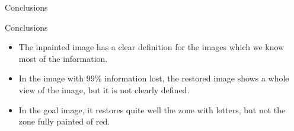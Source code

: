 \documentclass[11pt]{beamer}
\begin{document}
\begin{frame}{Conclusions}
\begin{block}{Conclusions}
\begin{itemize}
\item The inpainted image has a clear definition for the images which we know most of the information.
\item In the image with 99\% information lost, the restored image shows a whole view of the image, but it is not clearly defined.
\item In the goal image, it restores quite well the zone with letters, but not the zone fully painted of red.
\end{itemize}

\end{block}
\end{frame}
\end{document}
